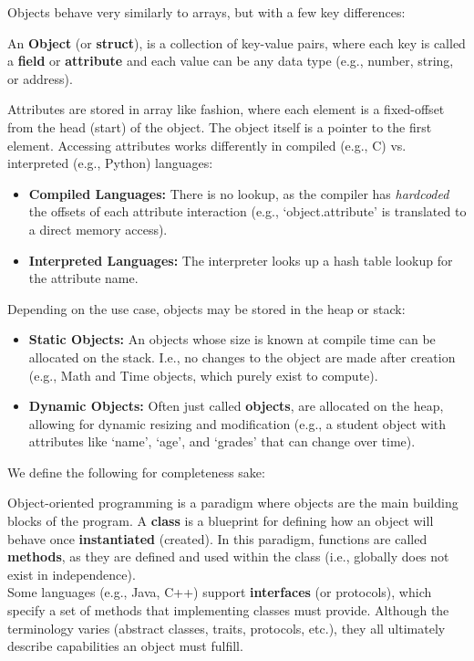 \noindent
Objects behave very similarly to arrays, but with a few key differences:
\begin{Def}

    An \textbf{Object} (or \textbf{struct}), is a collection of key-value pairs, 
    where each key is called a \textbf{field} or \textbf{attribute} and each value can be any data type (e.g., number, string, or address).

    Attributes are stored in array like fashion, where each element is a fixed-offset from the head (start) of the object.
    The object itself is a pointer to the first element. Accessing attributes works differently in compiled (e.g., C) vs. interpreted (e.g., Python) languages:
    \begin{itemize}
        \item \textbf{Compiled Languages:} There is no lookup, as the compiler has \emph{hardcoded} the offsets of each attribute interaction (e.g., `object.attribute' is translated to a direct memory access).
        \item \textbf{Interpreted Languages:} The interpreter looks up a hash table lookup for the attribute name.
    \end{itemize}

    \noindent
    Depending on the use case, objects may be stored in the heap or stack:
    \begin{itemize}
        \item \textbf{Static Objects:} An objects whose size is known at compile time can be allocated on the stack. I.e., no changes 
        to the object are made after creation (e.g., Math and Time objects, which purely exist to compute).
        \item \textbf{Dynamic Objects:} Often just called \textbf{objects}, are allocated on the heap, allowing for dynamic resizing and modification (e.g.,
        a student object with attributes like `name', `age', and `grades' that can change over time).
    \end{itemize}

\end{Def}

\noindent 
We define the following for completeness sake:
\begin{Def}

    Object-oriented programming is a paradigm where objects are the main building blocks of the program.
    A \textbf{class} is a blueprint for defining how an object will behave once \textbf{instantiated} (created). In this paradigm,
    functions are called \textbf{methods}, as they are defined and used within the class (i.e., globally does not exist in independence).\\

    \noindent
    Some languages (e.g., Java, C++) support \textbf{interfaces} (or protocols), which specify a set of methods that implementing classes must provide. Although the terminology varies 
    (abstract classes, traits, protocols, etc.), they all ultimately describe capabilities an object must fulfill.
\end{Def}


